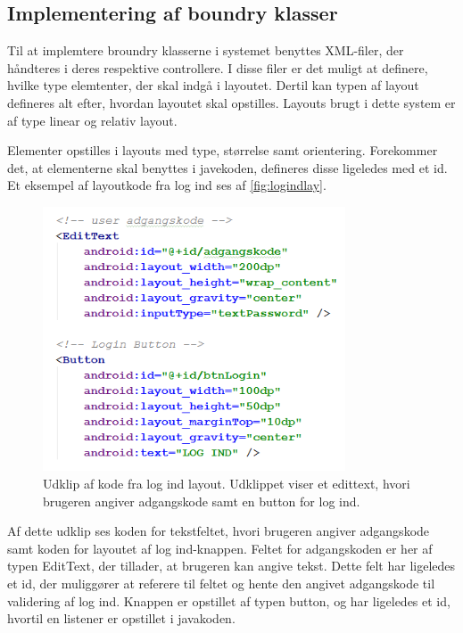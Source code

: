 \subsection{Implementering af boundry klasser}
Til at implemtere broundry klasserne i systemet benyttes XML-filer, der håndteres i deres respektive controllere. I disse filer er det muligt at definere, hvilke type elemtenter, der skal indgå i layoutet. Dertil kan typen af layout defineres alt efter, hvordan layoutet skal opstilles. Layouts brugt i dette system er af type linear og relativ layout.  

Elementer opstilles i layouts med type, størrelse samt orientering. Forekommer det, at elementerne skal benyttes i javekoden, defineres disse ligeledes med et id. Et eksempel af layoutkode fra log ind ses af \autoref{fig:logindlay}.

\begin{figure} [H]
\centering
\includegraphics[width=0.8\textwidth]{figures/imple/logindlay}
\caption{Udklip af kode fra log ind layout. Udklippet viser et edittext, hvori brugeren angiver adgangskode samt en button for log ind.}
\label{fig:logindlay}
\end{figure}

Af dette udklip ses koden for tekstfeltet, hvori brugeren angiver adgangskode samt koden for layoutet af log ind-knappen. Feltet for adgangskoden er her af typen EditText, der tillader, at brugeren kan angive tekst. Dette felt har ligeledes et id, der muliggører at referere til feltet og hente den angivet adgangskode til validering af log ind. Knappen er opstillet af typen button, og har ligeledes et id, hvortil en listener er opstillet i javakoden. 
